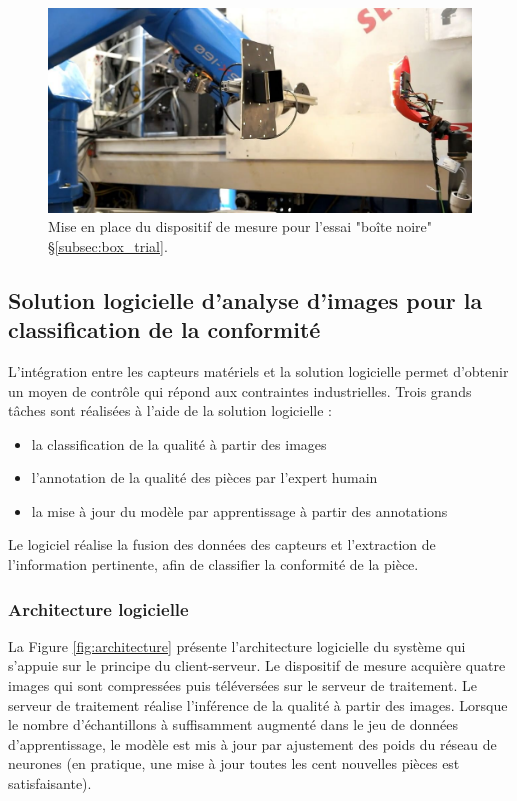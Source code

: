 \begin{figure}[hbtp]
	\centering
	\includegraphics[width=\textwidth,height=\textheight,keepaspectratio]{../Chap5/Figures/TheEye_on.jpg}
	\caption{Mise en place du dispositif de mesure pour l'essai "boîte noire" §\ref{subsec:box_trial}.}
	\label{fig:theeye_situation}
\end{figure}


\subsection{Solution logicielle d'analyse d'images pour la classification de la conformité}
L’intégration entre les capteurs matériels et la solution logicielle permet d’obtenir un moyen de contrôle qui répond aux contraintes industrielles.
Trois grands tâches sont réalisées à l'aide de la solution logicielle :
\begin{itemize}
	\item la classification de la qualité à partir des images
	\item l'annotation de la qualité des pièces par l'expert humain
	\item la mise à jour du modèle par apprentissage à partir des annotations
\end{itemize}

Le logiciel réalise la fusion des données des capteurs et l’extraction de l’information pertinente, afin de classifier la conformité de la pièce.

\subsubsection{Architecture logicielle}
La Figure \ref{fig:architecture} présente l'architecture logicielle du système qui s'appuie sur le principe du client-serveur.
Le dispositif de mesure acquière quatre images qui sont compressées puis téléversées sur le serveur de traitement.
Le serveur de traitement réalise l'inférence de la qualité à partir des images.
Lorsque le nombre d'échantillons à suffisamment augmenté dans le jeu de données d'apprentissage, le modèle est mis à jour par ajustement des poids du réseau de neurones (en pratique, une mise à jour toutes les cent nouvelles pièces est satisfaisante).

